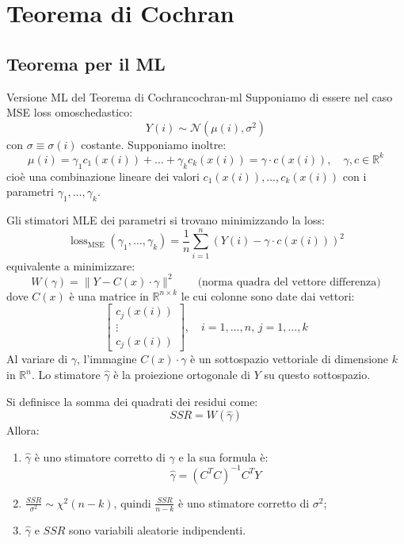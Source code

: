 \section{Teorema di Cochran}

\subsection{Teorema per il ML}
\begin{teorema}{Versione ML del Teorema di Cochran}{cochran-ml}
Supponiamo di essere nel caso MSE loss omoschedastico:
\[
Y(i) \sim \mathcal{N}(\mu(i), \sigma^2)
\]
con $\sigma \equiv \sigma(i)$ costante. Supponiamo inoltre:
\[
    \mu(i) = \gamma_1 c_1(x(i)) + \dots + \gamma_k c_k(x(i)) = \gamma \cdot c(x(i)), \quad \gamma,c \in \mathbb{R}^k
\]
cioè una combinazione lineare dei valori $c_1(x(i)), \ldots, c_k(x(i))$ con i parametri $\gamma_1, \ldots,
\gamma_k$.

Gli stimatori MLE dei parametri si trovano minimizzando la loss:
\[
\operatorname{loss}_{\text{MSE}}(\gamma_1, \dots, \gamma_k) = \frac{1}{n} \sum_{i=1}^n (Y(i) - \gamma \cdot c(x(i)))^2
\]
equivalente a minimizzare:
\[
    W(\gamma) = \| Y - C(x) \cdot \gamma \|^2 \qquad \text{(norma quadra del vettore
    differenza)}
\]
dove $C(x)$ è una matrice in $\mathbb{R}^{n \times k}$ le cui colonne sono date dai vettori:
\[
\begin{bmatrix}
c_j(x(i)) \\
\vdots \\
c_j(x(i))
\end{bmatrix}, \quad i = 1, \dots, n,\, j = 1, \dots, k
\]
Al variare di $\gamma$, l'immagine $C(x) \cdot \gamma$ è un sottospazio vettoriale di dimensione $k$ in $\mathbb{R}^n$. Lo stimatore $\hat{\gamma}$ è la proiezione ortogonale di $Y$ su questo sottospazio.

Si definisce la somma dei quadrati dei residui come:
\[
    SSR = W(\hat{\gamma})
\]
Allora:
\begin{enumerate}
    \item $\hat{\gamma}$ è uno stimatore corretto di $\gamma$ e la sua formula è:
        \begin{equation*}\label{eq:cochran-gamma-estimator}
            \hat{\gamma} = (C^T C)^{-1} C^T Y
        \end{equation*}
    \item \( \frac{SSR}{\sigma^2} \sim \chi^2(n-k) \), quindi \( \frac{SSR}{n-k} \) è uno stimatore corretto di $\sigma^2$;
  \item $\hat{\gamma}$ e $SSR$ sono variabili aleatorie indipendenti.
\end{enumerate}
\end{teorema}

